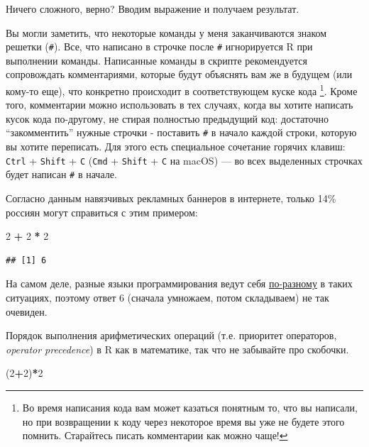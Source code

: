 \documentclass[]{book}
\newenvironment{Shaded}{\begin{snugshade}}{\end{snugshade}}
\newcommand{\DecValTok}[1]{\textcolor[rgb]{0.00,0.00,0.81}{#1}}
\newcommand{\StringTok}[1]{\textcolor[rgb]{0.31,0.60,0.02}{#1}}
\newcommand{\OperatorTok}[1]{\textcolor[rgb]{0.81,0.36,0.00}{\textbf{#1}}}
\newcommand{\NormalTok}[1]{#1}
\begin{document}
Ничего сложного, верно? Вводим выражение и получаем результат.

Вы могли заметить, что некоторые команды у меня заканчиваются знаком
решетки (\texttt{\#}). Все, что написано в строчке после \texttt{\#}
игнорируется R при выполнении команды. Написанные команды в скрипте
рекомендуется сопровождать комментариями, которые будут объяснять вам же
в будущем (или кому-то еще), что конкретно происходит в соответствующем
куске кода \footnote{Во время написания кода вам может казаться понятным
  то, что вы написали, но при возвращении к коду через некоторое время
  вы уже не будете этого помнить. Старайтесь писать комментарии как
  можно чаще!}. Кроме того, комментарии можно использовать в тех
случаях, когда вы хотите написать кусок кода по-другому, не стирая
полностью предыдущий код: достаточно ``закомментить'' нужные строчки -
поставить \texttt{\#} в начало каждой строки, которую вы хотите
переписать. Для этого есть специальное сочетание горячих клавиш:
\texttt{Ctrl} + \texttt{Shift} + \texttt{C} (\texttt{Cmd} +
\texttt{Shift} + \texttt{C} на macOS) --- во всех выделенных строчках
будет написан \texttt{\#} в начале.

Согласно данным навязчивых рекламных баннеров в интернете, только 14\%
россиян могут справиться с этим примером:

\begin{Shaded}
\begin{Highlighting}[]
\DecValTok{2} \OperatorTok{+}\StringTok{ }\DecValTok{2} \OperatorTok{*}\StringTok{ }\DecValTok{2}
\end{Highlighting}
\end{Shaded}

\begin{verbatim}
## [1] 6
\end{verbatim}

На самом деле, разные языки программирования ведут себя
\href{https://www.quora.com/Do-all-computer-languages-with-operator-precedence-use-the-same-operator-precedence}{по-разному}
в таких ситуациях, поэтому ответ 6 (сначала умножаем, потом складываем)
не так очевиден.

Порядок выполнения арифметических операций (т.е. приоритет операторов,
\emph{operator precedence}) в R как в математике, так что не забывайте
про скобочки.

\begin{Shaded}
\begin{Highlighting}[]
\NormalTok{(}\DecValTok{2}\OperatorTok{+}\DecValTok{2}\NormalTok{)}\OperatorTok{*}\DecValTok{2}
\end{Highlighting}
\end{Shaded}
\end{document}
